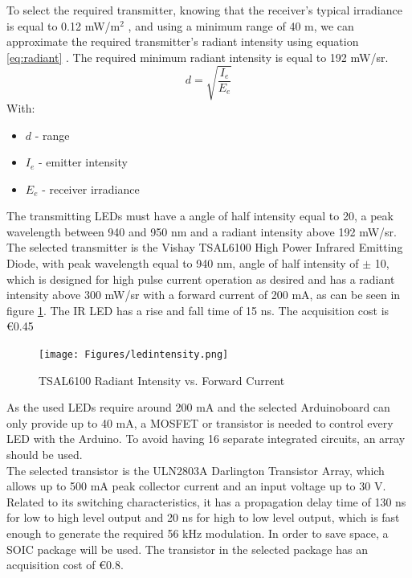To select the required transmitter, knowing that the receiver's typical irradiance is equal to 0.12 mW/m$^{2}$ \citep{Vishay2015}, and using a minimum range of 40 m, we can approximate the required transmitter's radiant intensity using equation \ref{eq:radiant} \citep{Vishay}. The required minimum radiant intensity is equal to 192 mW/sr.\\
\begin{equation}\label{eq:radiant}
d=\sqrt{\frac{I_{e}}{E_{e}}}
\end{equation}
With:
\begin{itemize}
\item $d$ - range
\item $I_{e}$ - emitter intensity
\item $E_{e}$ - receiver irradiance
\end{itemize}
The transmitting LEDs must have a angle of half intensity equal to 20\degree , a peak wavelength between 940 and 950 nm and a radiant intensity above 192 mW/sr. \\
The selected transmitter is the Vishay TSAL6100 High Power Infrared Emitting Diode, with peak wavelength equal to 940 nm, angle of half intensity of $\pm$ 10\degree , which is designed for high pulse current operation as desired and has a radiant intensity above 300 mW/sr with a forward current of 200 mA, as can be seen in figure \ref{fig:ledintensity}. The IR LED has a rise and fall time of 15 ns. The acquisition cost is \euro{0.45}\\
\begin{figure}[!htb]
  \centering
  \texttt{[image: Figures/ledintensity.png]}
  \caption[TSAL6100 Radiant Intensity vs. Forward Current \citep{Vishay2014}]{TSAL6100 Radiant Intensity vs. Forward Current \citep{Vishay2014}}
  \label{fig:ledintensity}
\end{figure}
As the used LEDs require around 200 mA and the selected Arduino\texttrademark board can only provide up to 40 mA, a MOSFET or transistor is needed to control every LED with the Arduino. To avoid having 16 separate integrated circuits, an array should be used.\\
The selected transistor is the ULN2803A Darlington Transistor Array, which allows up to 500 mA peak collector current and an input voltage up to 30 V. Related to its switching characteristics, it has a propagation delay time of 130 ns for low to high level output and 20 ns for high to low level output, which is fast enough to generate the required 56 kHz modulation. In order to save space, a SOIC package will be used. The transistor in the selected package has an acquisition cost of \euro{0.8}.\\

